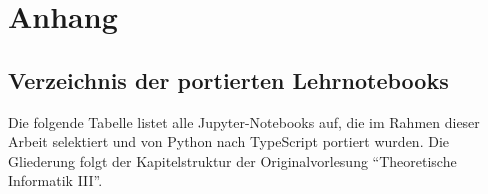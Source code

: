 %



\appendix
\section{Anhang}
\label{sec:anhang}

\subsection{Verzeichnis der portierten Lehrnotebooks}
\label{app:notebook_liste}

Die folgende Tabelle listet alle Jupyter-Notebooks auf, die im Rahmen dieser Arbeit selektiert und von Python nach TypeScript portiert wurden. Die Gliederung folgt der Kapitelstruktur der Originalvorlesung \enquote{Theoretische Informatik III}.

